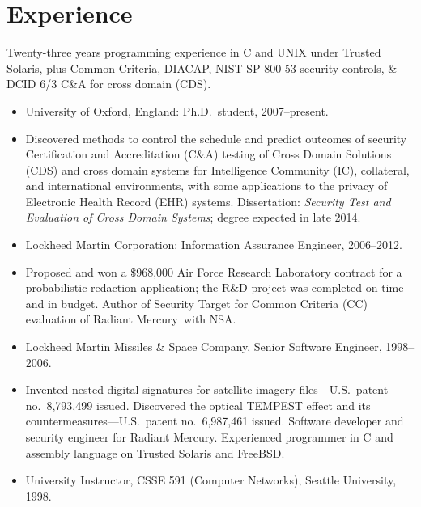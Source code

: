 \documentclass[12pt,twoside,letterpaper]{article}
\providecommand{\rmtrademark}{\raisebox{\height}{\tiny (TM)}}
\newenvironment{myquote}{\list{}{\leftmargin=0.15in\rightmargin=0in}\item[]}{\endlist}
\begin{document}
\vspace{-8mm}
\section*{Experience}
\vspace{-2mm}

Twenty-three years programming experience in C and UNIX under Trusted
Solaris, plus Common Criteria, DIACAP, NIST SP 800-53 security controls,
\& DCID 6/3 C\&A for cross domain (CDS).

\begin{itemize}
	\item University of Oxford, England: Ph.D.\ student, 2007--present.
		\vspace{-2mm}
		\begin{myquote}
			Discovered methods to control the schedule and predict
			outcomes of security Certification and Accreditation
			(C\&A) testing of Cross Domain Solutions (CDS) and cross
			domain systems for Intelligence Community (IC), collateral,
			and international environments, with some applications to the
			privacy of Electronic Health Record (EHR) systems. Dissertation:
			\emph{Security Test and Evaluation of Cross Domain Systems};
			degree expected in late 2014.
		\end{myquote}
\vspace{-2.5mm}
	\item Lockheed Martin Corporation: Information Assurance Engineer, 2006--2012.
		\vspace{-2mm}
		\begin{myquote}
			Proposed and won a \$968,000 Air Force Research Laboratory contract
			for a probabilistic redaction application; the R\&D project was completed
			on time and in budget. Author of Security Target for Common Criteria
			(CC) evaluation of Radiant Mercury\rmtrademark\ with
			NSA.
		\end{myquote}
\vspace{-2.5mm}
	\item Lockheed Martin Missiles \& Space Company, Senior Software Engineer, 1998--2006.
		\vspace{-2mm}
		\begin{myquote}
			Invented nested digital signatures for satellite imagery
			files---U.S.\ patent no.~8,793,499 issued. Discovered the
			optical TEMPEST effect and its countermeasures---U.S.\ patent
			no.~6,987,461 issued. Software developer and security engineer
			for Radiant Mercury\rmtrademark. Experienced programmer
			in C and assembly language on Trusted Solaris and FreeBSD.
		\end{myquote}
\vspace{-2.5mm}
	\item University Instructor, CSSE 591 (Computer Networks), Seattle University, 1998.
\end{itemize}
\end{document}
